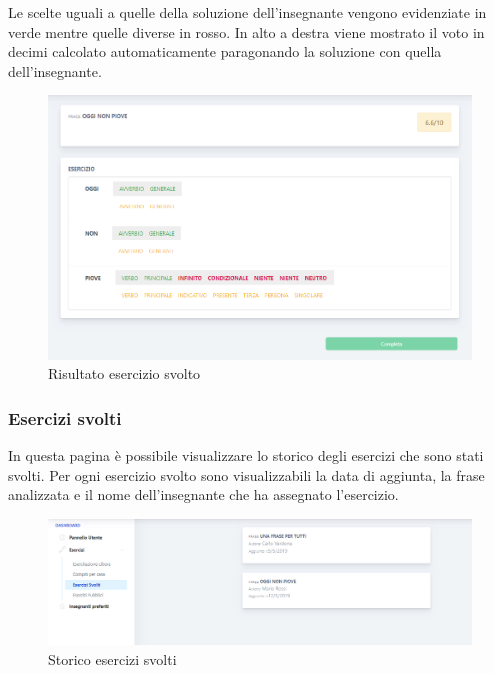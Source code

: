 	Le scelte uguali a quelle della soluzione dell'insegnante vengono evidenziate in verde mentre quelle diverse in rosso. In alto a destra viene mostrato il voto in decimi calcolato automaticamente paragonando la soluzione con quella dell'insegnante.
	
	\begin{figure}[H]
            	\centering
            	\includegraphics[width=17cm]{sez/img/studente/risultatoEsercizio.png} 
            	\caption{Risultato esercizio svolto}\label{fig:1}
        	\end{figure}
        
        
        
        \subsubsection{Esercizi svolti}
                 In questa pagina è possibile visualizzare lo storico degli esercizi che sono stati svolti. Per ogni esercizio svolto sono visualizzabili la data di aggiunta, la frase analizzata e il nome dell'insegnante che ha assegnato l'esercizio.
        	\begin{figure}[H]
            	\centering
            	\includegraphics[width=17cm]{sez/img/studente/esercizisvolti.PNG} 
            	\caption{Storico esercizi svolti}\label{fig:1}
        	\end{figure}
 
